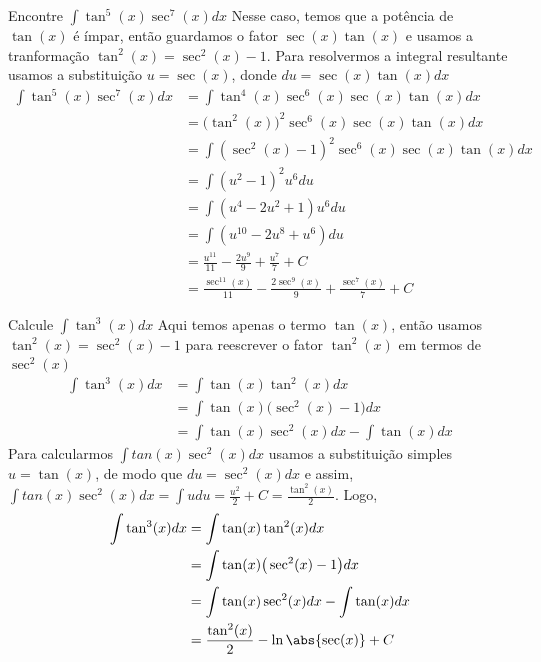 \begin{example}
  Encontre \(\int \tan^5(x) \sec^7(x) dx\)
  \solution
  Nesse caso, temos que a potência de $\tan(x)$ é ímpar, então guardamos
  o fator $\sec(x)\tan(x)$ e usamos a tranformação
  $\tan^2(x)= \sec^2(x)-1$.
  Para resolvermos a integral resultante usamos a substituição
  $u= \sec(x)$, donde $du= \sec(x)\tan(x)dx$
  \begin{align*}
    \int \tan^5(x) \sec^7(x) dx
    & = \int \tan^4(x) \sec^6(x) \sec(x) \tan(x) dx \\
    & = \big(\tan^2(x)\big)^2 \sec^6(x) \sec(x) \tan(x) dx \\
    & = \int (\sec^2(x)-1)^2\sec^6(x) \sec(x) \tan(x) dx \\
    & = \int (u^2-1)^2 u^6 du \\
    & = \int (u^4-2u^2+1)u^6 du \\
    & = \int (u^{10}-2u^8+u^6 )du \\
    & = \frac{u^{11}}{11}-\frac{2u^9}{9}+ \frac{u^7}{7}+C \\
    & = \frac{\sec^{11}(x)}{11}-\frac{2\sec^9(x)}{9}+ \frac{\sec^7(x)}{7}+C
  \end{align*}
\end{example}

\begin{example}
  Calcule \(\int \tan^3(x) dx\)
  \solution
  Aqui temos apenas o termo $\tan(x)$, então usamos
  $\tan^2(x)= \sec^2(x)-1$ para reescrever o fator
  $\tan^2(x)$ em termos de $\sec^2(x)$
  \begin{align*}
    \int \tan^3(x) dx
    & = \int \tan(x) \tan^2(x) dx \\
    & = \int \tan(x)\big(\sec^2(x)-1\big) dx \\
    & = \int \tan(x)\sec^2(x) dx- \int \tan(x) dx
  \end{align*}
  Para calcularmos $\int tan(x)\sec^2(x) dx$
  usamos a substituição simples $u=\tan(x)$,
  de modo que $du= \sec^2(x)dx$ e assim,
  $\int tan(x)\sec^2(x) dx= \int udu= \frac{u^2}{2}+ C= \frac{\tan^2(x)}{2}$.
  Logo,
  \begin{align*}
    \int \tan^3(x) dx
    & = \int \tan(x) \tan^2(x) dx \\
    & = \int \tan(x)\big(\sec^2(x)-1\big)dx \\
    & = \int \tan(x)\sec^2(x) dx- \int \tan(x) dx \\
    & = \frac{\tan^2(x)}{2}- \ln\abs{\sec(x)}+C
  \end{align*}
\end{example}


